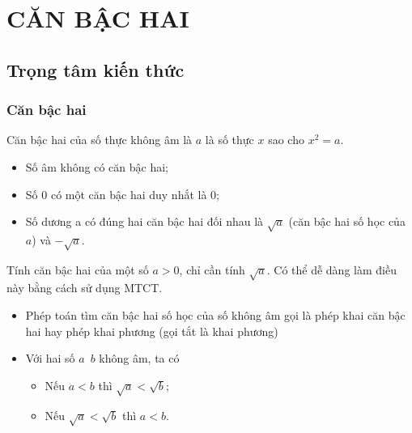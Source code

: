 \setcounter{section}{0}
\section{CĂN BẬC HAI}
\subsection{Trọng tâm kiến thức}
\begin{tomtat}
\subsubsection{Căn bậc hai}
\begin{boxdn}
	Căn bậc hai của số thực không âm là $a$ là số thực $x$ sao cho $x^2=a$.
\end{boxdn}
	\begin{nx}
	\begin{itemize}
	\item Số âm không có căn bậc hai;
	\item Số $0$ có một căn bậc hai duy nhắt là $0$;
	\item Số dương a có đúng hai căn bậc hai đối nhau là $\sqrt{a}$ (căn bậc hai số học của $a$) và $-\sqrt{a}$.
	\end{itemize}
	\end{nx}
\begin{note}
Tính căn bậc hai của một số $a>0$, chỉ cần tính $\sqrt{a}$. Có thể dễ dàng làm điều này bằng cách sử dụng MTCT.
\end{note}
\begin{note}
	\begin{itemize}
		\item
		Phép toán tìm căn bậc hai số học của số không âm gọi là phép khai căn bậc hai hay phép khai phương (gọi tắt là khai phương)
		\item 
		Với hai số $a$\ $b$ không âm, ta có
		\begin{multicols}{2}
			\begin{itemize}
				\item Nếu $a<b$ thì $\sqrt{a}<\sqrt{b}$;
				\item Nếu $\sqrt{a}<\sqrt{b}$ thì $a<b$.
			\end{itemize}
		\end{multicols}
	\end{itemize}
\end{note}

\end{tomtat}
